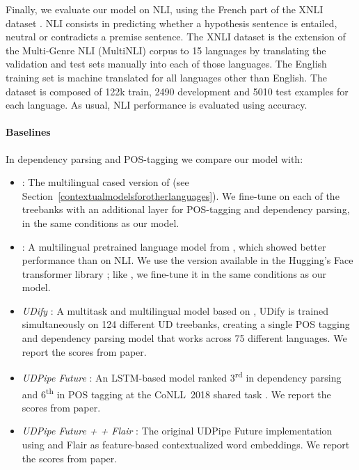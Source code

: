 Finally, we evaluate our model on NLI, using the French part of the XNLI dataset \cite{conneau-etal-2018-xnli}. NLI consists in predicting whether a hypothesis sentence is entailed, neutral or contradicts a premise sentence. The XNLI dataset is the extension of the Multi-Genre NLI (MultiNLI) corpus \cite{williams-etal-2018-broad} to 15 languages by translating the validation and test sets manually into each of those languages.
The English training set is machine translated for all languages other than English.
The dataset is composed of 122k train, 2490 development and 5010 test examples for each language.
As usual, NLI performance is evaluated using accuracy.


\paragraph{Baselines}
In dependency parsing and POS-tagging we compare our model with:

\begin{itemize}
    \item \emph{\mbert}: The multilingual cased version of \bert (see Section~\ref{contextualmodelsforotherlanguages}). We fine-tune \mbert on each of the treebanks with an additional layer for POS-tagging and dependency parsing, in the same conditions as our \camembert model.
    \item \emph{\xlmmlmtlm}: A multilingual pretrained language model from \citet{conneau-lample-2019-cross}, which showed better performance than \mbert on NLI. We use the version available in the Hugging's Face transformer library \cite{wolf-etal-2019-huggingface}; like \mbert, we fine-tune it in the same conditions as our model.
    \item \emph{UDify} \cite{kondratyuk-straka-2019-75}: A multitask and multilingual model based on \mbert, UDify is trained simultaneously on 124 different UD treebanks, creating a single POS tagging and dependency parsing model that works across 75 different languages. We report the scores from \citet{kondratyuk-straka-2019-75} paper.
    \item \emph{UDPipe Future} \citep{straka-2018-udpipe}: An LSTM-based model ranked 3\textsuperscript{rd} in dependency parsing and 6\textsuperscript{th} in POS tagging at the CoNLL~2018 shared task \citep{seker-etal-2018-universal}. We report the scores from \citet{kondratyuk-straka-2019-75} paper.
    \item \emph{UDPipe Future + \mbert + Flair} \citep{straka-strakova-2019-evaluating}: The original UDPipe Future implementation using \mbert and Flair as feature-based contextualized word embeddings. We report the scores from \citet{straka-strakova-2019-evaluating} paper.
\end{itemize}

